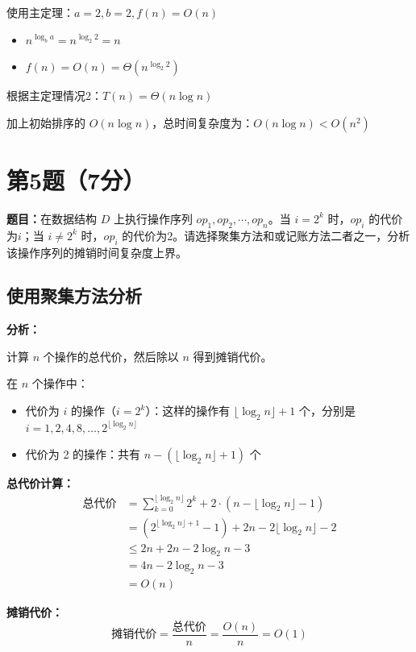 \documentclass[UTF8,12pt,a4paper]{ctexart}
\begin{document}
使用主定理：$a = 2, b = 2, f(n) = O(n)$
\begin{itemize}
	\item $n^{\log_b a} = n^{\log_2 2} = n$
	\item $f(n) = O(n) = \Theta(n^{\log_2 2})$
\end{itemize}

根据主定理情况2：$T(n) = \Theta(n \log n)$

加上初始排序的 $O(n \log n)$，总时间复杂度为：$O(n \log n) < O(n^2)$


\section*{第5题（7分）}
\textbf{题目：}在数据结构 $D$ 上执行操作序列 $op_{1}, op_{2}, \cdots, op_{n}$。当 $i=2^{k}$ 时，$op_i$ 的代价为$i$；当 $i \neq 2^{k}$ 时，$op_i$ 的代价为2。请选择聚集方法和或记账方法二者之一，分析该操作序列的摊销时间复杂度上界。

\subsection*{使用聚集方法分析}

\textbf{分析：}

计算 $n$ 个操作的总代价，然后除以 $n$ 得到摊销代价。

在 $n$ 个操作中：
\begin{itemize}
	\item 代价为 $i$ 的操作（$i = 2^k$）：这样的操作有 $\lfloor \log_2 n \rfloor + 1$ 个，分别是 $i = 1, 2, 4, 8, \ldots, 2^{\lfloor \log_2 n \rfloor}$
	\item 代价为 2 的操作：共有 $n - (\lfloor \log_2 n \rfloor + 1)$ 个
\end{itemize}

\textbf{总代价计算：}
\begin{align*}
\text{总代价} &= \sum_{k=0}^{\lfloor \log_2 n \rfloor} 2^k + 2 \cdot (n - \lfloor \log_2 n \rfloor - 1) \\
&= (2^{\lfloor \log_2 n \rfloor + 1} - 1) + 2n - 2\lfloor \log_2 n \rfloor - 2 \\
&\leq 2n + 2n - 2\log_2 n - 3 \\
&= 4n - 2\log_2 n - 3 \\
&= O(n)
\end{align*}

\textbf{摊销代价：}
$$\text{摊销代价} = \frac{\text{总代价}}{n} = \frac{O(n)}{n} = O(1)$$
\end{document}
